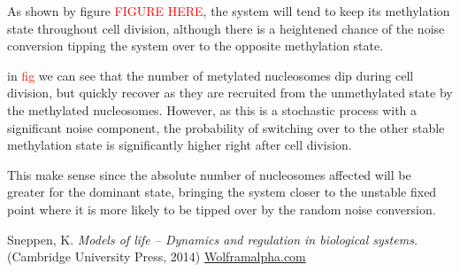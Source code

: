 \documentclass{article}
\begin{document}

As shown by figure \textcolor{red}{FIGURE HERE}, the system will tend to keep its methylation state throughout cell division, although there is a heightened chance of the noise conversion tipping the system over to the opposite methylation state. 


in \textcolor{red}{ fig  } we can see that the number of metylated nucleosomes dip during cell division, but quickly recover as they are recruited from the unmethylated state by the methylated nucleosomes. However, as this is a stochastic process with a significant noise component, the probability of switching over to the other stable methylation state is significantly higher right after cell division. 

This make sense since the absolute number of nucleosomes affected will be greater for the dominant state, bringing the system closer to the unstable fixed point where it is more likely to be tipped over by the random noise conversion. 
 




\begin{thebibliography}{3}
Sneppen, K. \textit{Models of life -- Dynamics and regulation in biological systems.} (Cambridge University Press, 2014)
\href{Wolframalpha.com}{Wolframalpha.com}
\end{thebibliography}
\end{document}
